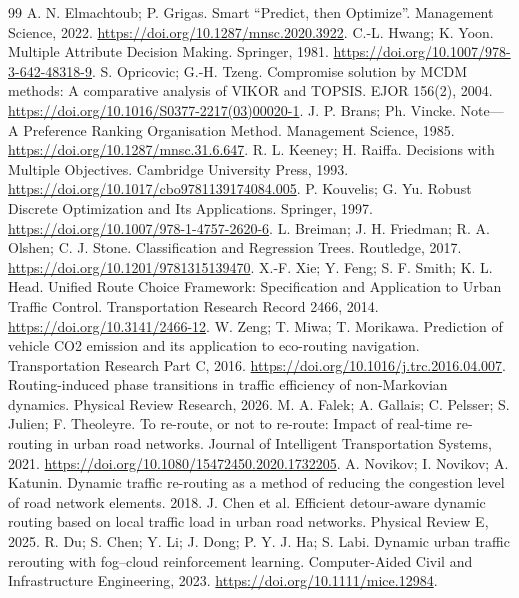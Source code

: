 \documentclass[10pt,a4paper]{article}
\begin{document}
\begin{thebibliography}{99}
 A. N. Elmachtoub; P. Grigas. Smart ``Predict, then Optimize''. Management Science, 2022. \url{https://doi.org/10.1287/mnsc.2020.3922}.
 C.-L. Hwang; K. Yoon. Multiple Attribute Decision Making. Springer, 1981. \url{https://doi.org/10.1007/978-3-642-48318-9}.
 S. Opricovic; G.-H. Tzeng. Compromise solution by MCDM methods: A comparative analysis of VIKOR and TOPSIS. EJOR 156(2), 2004. \url{https://doi.org/10.1016/S0377-2217(03)00020-1}.
 J. P. Brans; Ph. Vincke. Note---A Preference Ranking Organisation Method. Management Science, 1985. \url{https://doi.org/10.1287/mnsc.31.6.647}.
 R. L. Keeney; H. Raiffa. Decisions with Multiple Objectives. Cambridge University Press, 1993. \url{https://doi.org/10.1017/cbo9781139174084.005}.
 P. Kouvelis; G. Yu. Robust Discrete Optimization and Its Applications. Springer, 1997. \url{https://doi.org/10.1007/978-1-4757-2620-6}.
 L. Breiman; J. H. Friedman; R. A. Olshen; C. J. Stone. Classification and Regression Trees. Routledge, 2017. \url{https://doi.org/10.1201/9781315139470}.
 X.-F. Xie; Y. Feng; S. F. Smith; K. L. Head. Unified Route Choice Framework: Specification and Application to Urban Traffic Control. Transportation Research Record 2466, 2014. \url{https://doi.org/10.3141/2466-12}.
 W. Zeng; T. Miwa; T. Morikawa. Prediction of vehicle CO2 emission and its application to eco-routing navigation. Transportation Research Part C, 2016. \url{https://doi.org/10.1016/j.trc.2016.04.007}.
 Routing-induced phase transitions in traffic efficiency of non-Markovian dynamics. Physical Review Research, 2026.
 M. A. Falek; A. Gallais; C. Pelsser; S. Julien; F. Theoleyre. To re-route, or not to re-route: Impact of real-time re-routing in urban road networks. Journal of Intelligent Transportation Systems, 2021. \url{https://doi.org/10.1080/15472450.2020.1732205}.
 A. Novikov; I. Novikov; A. Katunin. Dynamic traffic re-routing as a method of reducing the congestion level of road network elements. 2018.
 J. Chen et al. Efficient detour-aware dynamic routing based on local traffic load in urban road networks. Physical Review E, 2025.
 R. Du; S. Chen; Y. Li; J. Dong; P. Y. J. Ha; S. Labi. Dynamic urban traffic rerouting with fog--cloud reinforcement learning. Computer-Aided Civil and Infrastructure Engineering, 2023. \url{https://doi.org/10.1111/mice.12984}.
\end{thebibliography}
\end{document}
